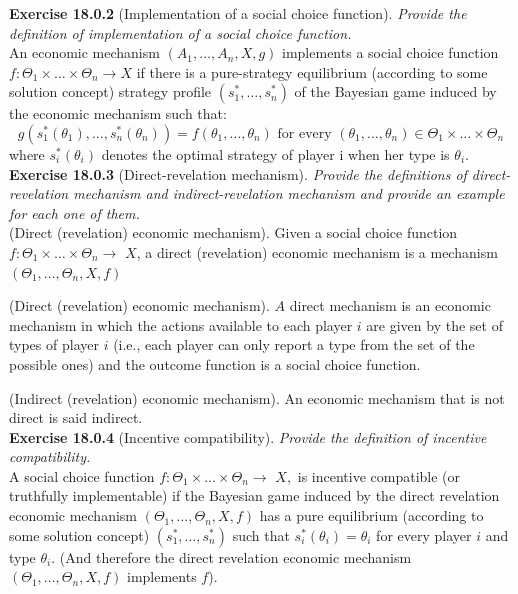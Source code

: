 \textbf{Exercise 18.0.2} (Implementation of a social choice function). \textit{Provide the definition of implementation of a social choice function.}\\

An economic mechanism $\left(A_{1}, \ldots, A_{n}, X, g\right)$ implements a social choice function $f: \Theta_{1} \times \ldots \times \Theta_{n} \rightarrow X$ if there is a pure-strategy equilibrium (according to
some solution concept) strategy profile $\left(s_{1}^{*}, \ldots, s_{n}^{*}\right)$ of the Bayesian game induced by the economic mechanism such that:
$$
g\left(s_{1}^{*}\left(\theta_{1}\right), \ldots, s_{n}^{*}\left(\theta_{n}\right)\right)=f\left(\theta_{1}, \ldots, \theta_{n}\right) \text { for every }\left(\theta_{1}, \ldots, \theta_{n}\right) \in \Theta_{1} \times \ldots \times \Theta_{n}
$$
where $s_{i}^{*}\left(\theta_{i}\right)$ denotes the optimal strategy of player i when her type is $\theta_{i}$.\\

\textbf{Exercise 18.0.3} (Direct-revelation mechanism). \textit{Provide the definitions of direct-revelation mechanism and indirect-revelation mechanism and provide an example for each one of them.}\\

(Direct (revelation) economic mechanism). Given a social choice function $f: \Theta_{1} \times \ldots \times \Theta_{n} \rightarrow$ $X$, a direct (revelation) economic mechanism is a mechanism $\left(\Theta_{1}, \ldots, \Theta_{n}, X, f\right)$

(Direct (revelation) economic mechanism). $A$ direct mechanism is an economic mechanism in which the actions available to each player $i$ are given by the set of types of player $i$ (i.e., each player can only report a type from the set of the possible ones) and the outcome function is a social choice function.

(Indirect (revelation) economic mechanism). An economic mechanism that is not direct is said indirect.\\

\textbf{Exercise 18.0.4} (Incentive compatibility). \textit{Provide the definition of incentive compatibility.}\\

A social choice function $f: \Theta_{1} \times \ldots \times \Theta_{n} \rightarrow$ $X,$ is incentive compatible (or truthfully implementable) if the Bayesian game induced by the direct revelation economic mechanism $(\Theta_{1}, \ldots, \Theta_{n}, X, f)$ has a pure equilibrium (according to some solution concept) $(s^*_1, \ldots, s^*_n)$ such that $s^*_i (\theta_i) = \theta_i$ for every player $i$ and type $\theta_i$. (And therefore the direct revelation economic mechanism $(\Theta_{1}, \ldots, \Theta_{n}, X, f)$ implements $f$).

